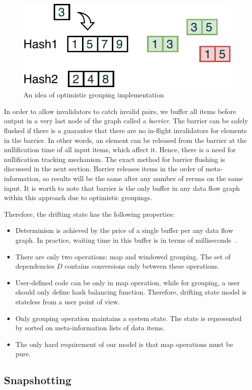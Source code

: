 \begin{figure}[htbp]
  \centering
  \includegraphics[width=.35\textwidth]{pics/grouping-invalidation}
  \caption{An idea of optimistic grouping implementation}
  \label {optimistic-grouping}
\end{figure} 
 
In order to allow invalidators to catch invalid pairs, we buffer all items before output in a very last node of the graph called a {\em barrier}. The barrier can be safely flushed if there is a guarantee that there are no in-flight invalidators for elements in the barrier. In other words, an element can be released from the barrier at the nullification time of all input items, which affect it. Hence, there is a need for nullification tracking mechanism. The exact method for barrier flushing is discussed in the next section. Barrier releases items in the order of meta-information, so results will be the same after any number of reruns on the same input. It is worth to note that barrier is the only buffer in any data flow graph within this approach due to optimistic groupings. 

Therefore, the drifting state has the following properties:
\begin{itemize}
    \item Determinism is achieved by the price of a single buffer per any data flow graph. In practice, waiting time in this buffer is in terms of milliseconds~\cite{we2018adbis}.
    \item There are only two operations: map and windowed grouping. The set of dependencies $D$ contains conversions only between these operations.
    \item User-defined code can be only in map operation, while for grouping, a user should only define hash balancing function. Therefore, drifting state model is stateless from a user point of view.
    \item Only grouping operation maintains a system state. The state is represented by sorted on meta-information lists of data items.
    \item The only hard requirement of our model is that map operations must be pure.
\end{itemize}

\subsection{Snapshotting}

